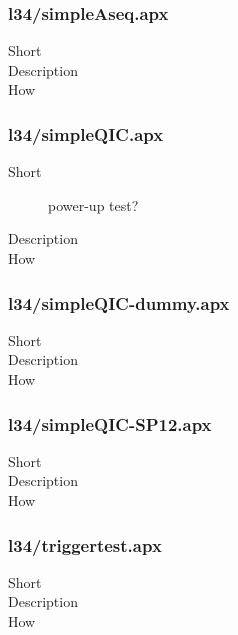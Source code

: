 \subsubsection{l34/simpleAseq.apx}
\begin{description}
\item[Short] 

\item[Description] 

\item[How] 

\end{description}

\subsubsection{l34/simpleQIC.apx}
\begin{description}
\item[Short] 
 power-up test?
\item[Description] 

\item[How] 

\end{description}

\subsubsection{l34/simpleQIC-dummy.apx}
\begin{description}
\item[Short] 

\item[Description] 

\item[How] 

\end{description}

\subsubsection{l34/simpleQIC-SP12.apx}
\begin{description}
\item[Short] 

\item[Description] 

\item[How] 

\end{description}

\subsubsection{l34/triggertest.apx}
\begin{description}
\item[Short] 

\item[Description] 

\item[How] 

\end{description}

